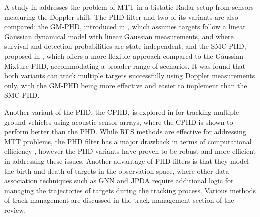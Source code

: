 A study in \cite{Guldogan2014} addresses the problem of \ac{MTT} in a bistatic \ac{Radar} setup from sensors measuring the Doppler shift. The \ac{PHD} filter and two of its variants are also compared: the \ac{GM-PHD}, introduced in \cite{Vo2006}, which assumes targets follow a linear Gaussian dynamical model with linear Gaussian measurements, and where survival and detection probabilities are state-independent; and the \ac{SMC-PHD}, proposed in \cite{Vo2005}, which offers a more flexible approach compared to the Gaussian Mixture \ac{PHD}, accommodating a broader range of scenarios. It was found that both variants can track multiple targets successfully using Doppler measurements only, with the \ac{GM-PHD} being more effective and easier to implement than the \ac{SMC-PHD}. 

Another variant of the \ac{PHD}, the \ac{CPHD}, is explored in \cite{Ozkan2011} for tracking multiple ground vehicles using acoustic sensor arrays, where the \ac{CPHD} is shown to perform better than the \ac{PHD}. While \ac{RFS} methods are effective for addressing \ac{MTT} problems, the \ac{PHD} filter has a major drawback in terms of computational efficiency \cite{Prihoda2019}, however the \ac{PHD} variants have proven to be robust and more efficient in addressing these issues. Another advantage of \ac{PHD} filters is that they model the birth and death of targets in the observation space, where other data association techniques such as \ac{GNN} and \ac{JPDA} require additional logic for managing the trajectories of targets during the tracking process. Various methods of track management are discussed in the track management section of the review.

